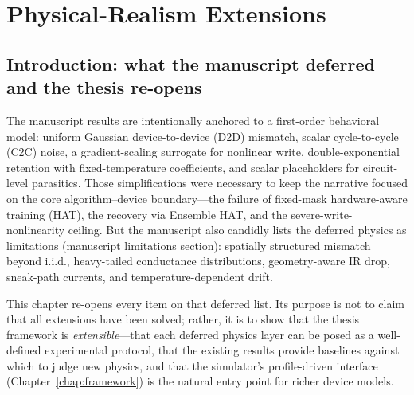 
%

\chapter{Physical-Realism Extensions}
\label{chap:physical-realism}

\section{Introduction: what the manuscript deferred and the thesis re-opens}
\label{sec:pr-intro}

The manuscript results are intentionally anchored to a first-order behavioral model: uniform Gaussian device-to-device (D2D) mismatch, scalar cycle-to-cycle (C2C) noise, a gradient-scaling surrogate for nonlinear write, double-exponential retention with fixed-temperature coefficients, and scalar placeholders for circuit-level parasitics.  Those simplifications were necessary to keep the narrative focused on the core algorithm--device boundary---the failure of fixed-mask hardware-aware training (HAT), the recovery via Ensemble HAT, and the severe-write-nonlinearity ceiling.  But the manuscript also candidly lists the deferred physics as limitations (manuscript limitations section): spatially structured mismatch beyond i.i.d., heavy-tailed conductance distributions, geometry-aware IR drop, sneak-path currents, and temperature-dependent drift.

This chapter re-opens every item on that deferred list.  Its purpose is not to claim that all extensions have been solved; rather, it is to show that the thesis framework is 
\emph{extensible}---that each deferred physics layer can be posed as a well-defined experimental protocol, that the existing results provide baselines against which to judge new physics, and that the simulator's profile-driven interface (Chapter~\ref{chap:framework}) is the natural entry point for richer device models.

